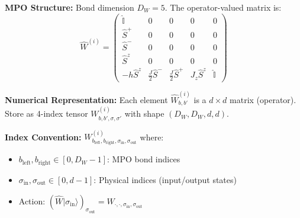 \documentclass[aps,prb,onecolumn,scriptaddress]{revtex4-2}
\newcommand{\ket}[1]{|#1\rangle}
\newcommand{\Id}{\mathbb{I}}
\begin{document}
	\textbf{MPO Structure:} Bond dimension $D_W = 5$. The operator-valued matrix is:
	\begin{equation}
		\hat{W}^{(i)} = \begin{pmatrix}
			\hat{\Id} & 0 & 0 & 0 & 0 \\
			\hat{S}^+ & 0 & 0 & 0 & 0 \\
			\hat{S}^- & 0 & 0 & 0 & 0 \\
			\hat{S}^z & 0 & 0 & 0 & 0 \\
			-h\hat{S}^z & \frac{J}{2}\hat{S}^- & \frac{J}{2}\hat{S}^+ & J_z \hat{S}^z & \hat{\Id}
		\end{pmatrix}
	\end{equation}
	
	\textbf{Numerical Representation:} Each element $\hat{W}^{(i)}_{b,b'}$ is a $d \times d$ matrix (operator). Store as 4-index tensor $W^{(i)}_{b,b',\sigma,\sigma'}$ with shape $(D_W, D_W, d, d)$.
	
	\textbf{Index Convention:} $W^{(i)}_{b_{\text{left}}, b_{\text{right}}, \sigma_{\text{in}}, \sigma_{\text{out}}}$ where:
	\begin{itemize}
		\item $b_{\text{left}}, b_{\text{right}} \in [0, D_W-1]$: MPO bond indices
		\item $\sigma_{\text{in}}, \sigma_{\text{out}} \in [0, d-1]$: Physical indices (input/output states)
		\item Action: $(\hat{W}\ket{\sigma_{\text{in}}})_{\sigma_{\text{out}}} = W_{\cdot,\cdot,\sigma_{\text{in}},\sigma_{\text{out}}}$
	\end{itemize}
	
\end{document}
